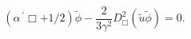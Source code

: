 \begin{equation}
\label{Psi} \left(\alpha^{\,\prime}\Box+1/2\right)\tilde{\phi}
-\frac{2}{3\gamma^2}D^2_\Box\left( \tilde{u}\tilde{\phi}\right)=0.
\end{equation}

